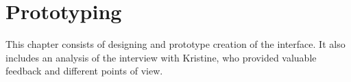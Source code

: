 \chapter{Prototyping}
This chapter consists of designing and prototype creation of the interface. It also includes an analysis of the interview with Kristine, who provided valuable feedback and different points of view.